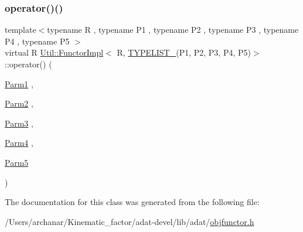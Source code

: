 \subsubsection{\texorpdfstring{operator()()}{operator()()}\hspace{0.1cm}{\footnotesize\ttfamily [3/3]}}
{\footnotesize\ttfamily template$<$typename R , typename P1 , typename P2 , typename P3 , typename P4 , typename P5 $>$ \\
virtual R \mbox{\hyperlink{classUtil_1_1FunctorImpl}{Util\+::\+Functor\+Impl}}$<$ R, \mbox{\hyperlink{adat__devel__install_2include_2adat_2typelist_8h_aad5d9b3c82c8503c85c625acd41c0a2f}{T\+Y\+P\+E\+L\+I\+S\+T\+\_}}(P1, P2, P3, P4, P5)$>$\+::operator() (\begin{DoxyParamCaption}\item[{\mbox{\hyperlink{structUtil_1_1Private_1_1FunctorImplBase_a9d61e693d6c616dea5bd9d9073c7d21a}{Parm1}}}]{,  }\item[{\mbox{\hyperlink{structUtil_1_1Private_1_1FunctorImplBase_a554085cd798ef14838a59b528f0feb2e}{Parm2}}}]{,  }\item[{\mbox{\hyperlink{structUtil_1_1Private_1_1FunctorImplBase_a052148e627fd4caecbcffdbdf1033dbb}{Parm3}}}]{,  }\item[{\mbox{\hyperlink{structUtil_1_1Private_1_1FunctorImplBase_a1ad7fe3f243480c44a610927ebe76762}{Parm4}}}]{,  }\item[{\mbox{\hyperlink{structUtil_1_1Private_1_1FunctorImplBase_ac5b1d132e854e4f9fd6fb1e43313fa26}{Parm5}}}]{ }\end{DoxyParamCaption})\hspace{0.3cm}{\ttfamily [pure virtual]}}



The documentation for this class was generated from the following file\+:\begin{DoxyCompactItemize}
\item 
/\+Users/archanar/\+Kinematic\+\_\+factor/adat-\/devel/lib/adat/\mbox{\hyperlink{adat-devel_2lib_2adat_2objfunctor_8h}{objfunctor.\+h}}\end{DoxyCompactItemize}
